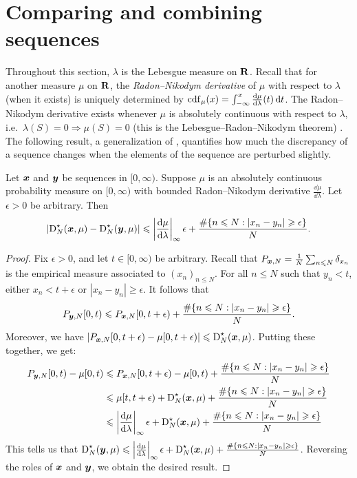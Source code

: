 \section{Comparing and combining sequences}

Throughout this section, $\lambda$ is the Lebesgue measure on $\mathbf{R}$. Recall 
that for another measure $\mu$ on $\mathbf{R}$, the \emph{Radon--Nikodym derivative} 
of $\mu$ with respect to $\lambda$ (when it exists) is uniquely determined by 
$\operatorname{cdf}_\mu(x) = \int_{-\infty}^x \frac{\mathrm{d}\mu}{\mathrm{d}\lambda}(t)\, \mathrm{d} t$. The 
Radon--Nikodym derivative exists whenever $\mu$ is absolutely continuous with 
respect to $\lambda$, i.e.~$\lambda(S) = 0\Rightarrow \mu(S)=0$ (this is the 
Lebesgue--Radon--Nikodym theorem) \cite[Th.~3.8]{folland-1999}. The following 
result, a generalization of \cite[Ch.~2 Th.~4.1]{kuipers-niederreiter-1974}, 
quantifies how much the discrepancy of a sequence changes when the elements of 
the sequence are perturbed slightly. 

\begin{lemma}\label{lem:disc-of-two-seq}
Let ${\boldsymbol x}$ and ${\boldsymbol y}$ be sequences in $[0,\infty)$. Suppose $\mu$ is an 
absolutely continuous probability measure on $[0,\infty)$ with bounded 
Radon--Nikodym derivative $\frac{\dd \mu}{\dd\lambda}$. Let $\epsilon>0$ be 
arbitrary. Then 
\[
	\left|\operatorname{D}_N^\star({\boldsymbol x}, \mu) - \operatorname{D}_N^\star({\boldsymbol y},\mu)\right| \leqslant \left|\frac{\mathrm{d}\mu}{\mathrm{d}\lambda}\right|_\infty \epsilon + \frac{\#\{ n\leqslant N : |x_n - y_n| \geqslant \epsilon\}}{N} .
\]
\end{lemma}
\begin{proof}
Fix $\epsilon>0$, and let $t\in [0,\infty)$ be arbitrary. Recall that 
$P_{{\boldsymbol x},N} = \frac 1 N \sum_{n\leqslant N} \delta_{x_n}$ is the empirical 
measure associated to $(x_n)_{n\leqslant N}$. For all $n\leqslant N$ such that 
$y_n<t$, either $x_n < t+\epsilon$ or $|x_n - y_n| \geqslant \epsilon$. It 
follows that 
\[
	P_{{\boldsymbol y},N}[0,t) \leqslant P_{{\boldsymbol x},N}[0,t+\epsilon) + \frac{\#\{ n\leqslant N : |x_n - y_n| \geqslant \epsilon\}}{N} .
\]
Moreover, we have 
$\left| P_{{\boldsymbol x},N}[0,t+\epsilon) - \mu[0,t+\epsilon)\right| \leqslant \operatorname{D}_N^\star({\boldsymbol x},\mu)$. Putting these together, we get: 
\begin{align*}
	P_{{\boldsymbol y},N}[0,t) - \mu[0,t) 
		&\leqslant P_{{\boldsymbol x},N}[0,t+\epsilon) - \mu[0,t) + \frac{\#\{ n\leqslant N : |x_n - y_n| \geqslant \epsilon\}}{N} \\
		&\leqslant \mu[t,t+\epsilon) + \operatorname{D}_N^\star({\boldsymbol x},\mu) + \frac{\#\{ n\leqslant N : |x_n - y_n| \geqslant \epsilon\}}{N} \\
		&\leqslant \left|\frac{\mathrm{d}\mu}{\mathrm{d}\lambda}\right|_\infty \epsilon + \operatorname{D}_N^\star({\boldsymbol x},\mu) + \frac{\#\{ n\leqslant N : |x_n - y_n| \geqslant \epsilon\}}{N} 
\end{align*}
This tells us that 
$\operatorname{D}_N^\star({\boldsymbol y},\mu) \leqslant \left|\frac{\mathrm{d}\mu}{\mathrm{d}\lambda}\right|_\infty \epsilon + \operatorname{D}_N^\star({\boldsymbol x},\mu) + \frac{\#\{ n\leqslant N : |x_n - y_n| \geqslant \epsilon\}}{N}$. 
Reversing the roles of ${\boldsymbol x}$ and ${\boldsymbol y}$, we obtain the desired result. 
\end{proof}

